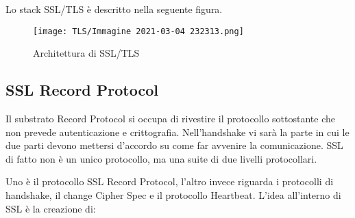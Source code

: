 \documentclass[14pt]{extreport}
\begin{document}
Lo stack SSL/TLS è descritto nella seguente figura.


\begin{figure}[H]
    \centering
    \texttt{[image: TLS/Immagine 2021-03-04 232313.png]}
    \caption{Architettura di SSL/TLS}
\end{figure}


\subsection{SSL Record Protocol}

Il substrato Record Protocol si occupa di rivestire il protocollo sottostante che non prevede autenticazione e crittografia.
Nell'handshake vi sarà la parte in cui le due parti devono mettersi d'accordo su come far avvenire la comunicazione.
SSL di fatto non è un unico protocollo, ma una suite di due livelli protocollari.

Uno è il protocollo SSL Record Protocol, l'altro invece riguarda i protocolli di handshake, il change Cipher Spec e il protocollo Heartbeat.
L'idea all'interno di SSL è la creazione di:
\end{document}
